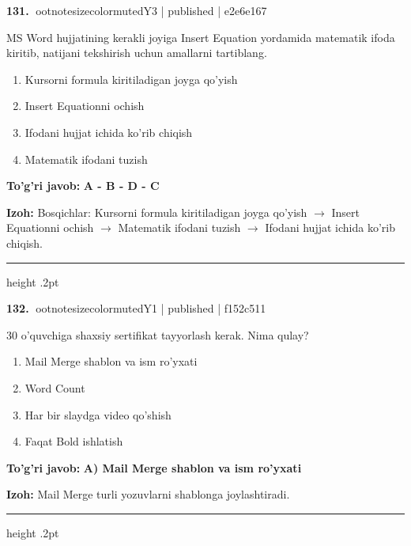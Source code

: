 \documentclass[10pt,a4paper]{article}
\begin{document}
\textbf{\color{ink}131.} {ootnotesizecolor{muted}Y3 | published | e2e6e167}
\par
MS Word hujjatining kerakli joyiga Insert Equation yordamida matematik ifoda kiritib, natijani tekshirish uchun amallarni tartiblang.
\begin{enumerate}[label=\Alph*),leftmargin=9mm]
\item Kursorni formula kiritiladigan joyga qo'yish
\item Insert Equationni ochish
\item Ifodani hujjat ichida ko'rib chiqish
\item Matematik ifodani tuzish
\end{enumerate}
\begin{tcolorbox}[enhanced,breakable,colback=teal!4,colframe=teal!55!black,boxrule=0.45pt,arc=1.2mm,left=2.8mm,right=2.8mm,top=2mm,bottom=2mm]
\textbf{\color{teal}To'g'ri javob:} \textbf{A - B - D - C}
\par\smallskip
\textbf{Izoh:} Bosqichlar: Kursorni formula kiritiladigan joyga qo'yish \ensuremath{\rightarrow} Insert Equationni ochish \ensuremath{\rightarrow} Matematik ifodani tuzish \ensuremath{\rightarrow} Ifodani hujjat ichida ko'rib chiqish.
\end{tcolorbox}
\vspace{2mm}\hrule height .2pt\vspace{2mm}

\textbf{\color{ink}132.} {ootnotesizecolor{muted}Y1 | published | f152c511}
\par
30 o'quvchiga shaxsiy sertifikat tayyorlash kerak. Nima qulay?
\begin{enumerate}[label=\Alph*),leftmargin=9mm]
\item Mail Merge shablon va ism ro'yxati
\item Word Count
\item Har bir slaydga video qo'shish
\item Faqat Bold ishlatish
\end{enumerate}
\begin{tcolorbox}[enhanced,breakable,colback=teal!4,colframe=teal!55!black,boxrule=0.45pt,arc=1.2mm,left=2.8mm,right=2.8mm,top=2mm,bottom=2mm]
\textbf{\color{teal}To'g'ri javob:} \textbf{A) Mail Merge shablon va ism ro'yxati}
\par\smallskip
\textbf{Izoh:} Mail Merge turli yozuvlarni shablonga joylashtiradi.
\end{tcolorbox}
\vspace{2mm}\hrule height .2pt\vspace{2mm}
\end{document}
